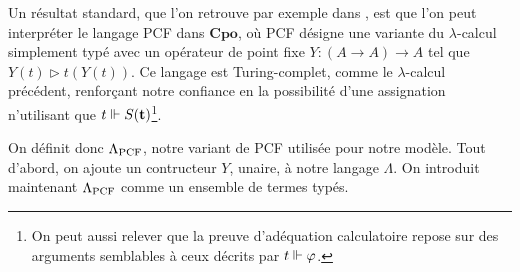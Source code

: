 \documentclass{article}
\begin{document}
Un résultat standard, que l'on retrouve par exemple dans \cite{Amadio_Curien_1998}, est que l'on peut interpréter le langage PCF dans $\mathbf{Cpo}$, où PCF désigne une variante du $\lambda$-calcul simplement typé avec un opérateur de point fixe $Y : (A \to A) \to A$ tel que $Y(t) \rhd t(Y(t))$. Ce langage est Turing-complet, comme le $\lambda$-calcul précédent, renforçant notre confiance en la possibilité d'une assignation n'utilisant que $t\Vdash S(\mathbf{t})$\footnote{On peut aussi relever que la preuve d'adéquation calculatoire repose sur des arguments semblables à ceux décrits par $t\Vdash \varphi$.}.

On définit donc $\Lambda_{\mathrm{PCF}}$, notre variant de PCF utilisée pour notre modèle. Tout d'abord, on ajoute un contructeur $Y$, unaire, à notre langage $\Lambda$. On introduit maintenant $\Lambda_{\mathrm{PCF}}$ comme un ensemble de termes typés.
\end{document}

